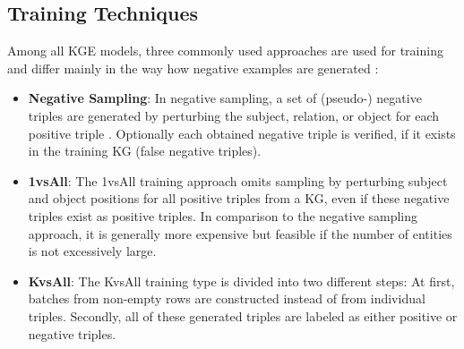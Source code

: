 \subsection{Training Techniques}
\label{subsec:training_techniques}
%
Among all \ac{KGE} models, three commonly used approaches are used for training and differ mainly in the way how negative examples are generated \cite{Ruffinelli2020You}:
\begin{itemize}
    \item  
    \textbf{Negative Sampling}:
    In negative sampling, a set of (pseudo-) negative triples are generated by perturbing the subject, relation, or object for each positive triple .
    Optionally each obtained negative triple is verified, if it exists in the training \ac{KG} (false negative triples).
    
    \item  
    \textbf{1vsAll}:
    The 1vsAll training approach omits sampling by perturbing subject and object positions for all positive triples from a \ac{KG}, even if these negative triples exist as positive triples.
    In comparison to the negative sampling approach, it is generally more expensive but feasible if the number of entities is not excessively large.
        
    \item  
    \textbf{KvsAll}: 
    The KvsAll training type is divided into two different steps:
    At first, batches from non-empty rows are constructed instead of from individual triples.
    Secondly, all of these generated triples are labeled as either positive or negative triples.
\end{itemize}



